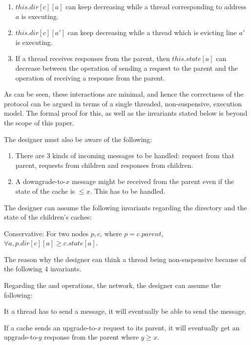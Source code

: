 \begin{enumerate}
\item $this.dir[c][a]$ can keep decreasing while a thread corresponding to
address $a$ is executing.
\item $this.dir[c][a']$ can keep decreasing while a thread which is evicting
line $a'$ is executing.
\item If a thread receives responses from the parent, then $this.state[a]$ can
decrease between the operation of sending a request to the parent and the
operation of receiving a response from the parent.
\end{enumerate}

As can be seen, these interactions are minimal, and hence the correctness of
the protocol can be argued in terms of a single threaded, non-suspensive, execution model.
The formal proof for this, as well as the invariants stated below is beyond the
scope of this paper.

The designer must also be aware of the following:
\begin{enumerate}
\item There are 3 kinds of incoming messages to be handled: request from that parent,
requests from children and responses from children.
\item A downgrade-to-$x$ message might be received from the parent even if the
state of the cache is $ \le x$. This has to be handled.
\end{enumerate}

The designer can assume the following invariants regarding the directory and the state
of the children's caches:
\begin{theorem}
Conservative: For two nodes $p, c$, where $p = c.parent$, $\forall a,
p.dir[c][a] \ge c.state[a]$.  \label{conservative}
\end{theorem}

The reason why the designer can think a thread being non-suspensive because of
the following 4 invariants.

Regarding the \send{} and \receive{} operations, \ie the network, the designer
can assume the following:
\begin{theorem}
It a thread has to send a message, it will eventually be able to send the
message.
\label{canSend}
\end{theorem}

\begin{theorem}
If a cache sends an upgrade-to-$x$ request to its parent, it will eventually
get an upgrade-to-$y$ response from the parent where $y \ge x$.
\label{willRecv}
\end{theorem}

